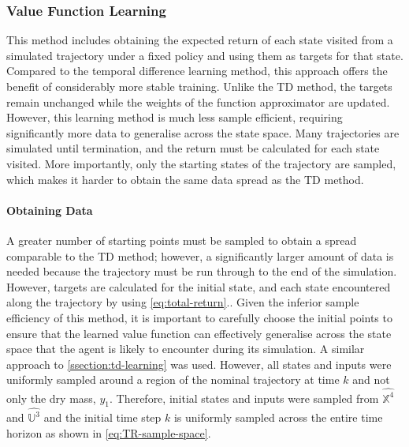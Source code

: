 \subsubsection{Value Function Learning}
This method includes obtaining the expected return of each state visited from a simulated trajectory under a fixed policy and using them as targets for that state. Compared to the temporal difference learning method, this approach offers the benefit of considerably more stable training. Unlike the TD method, the targets remain unchanged while the weights of the function approximator are updated. However, this learning method is much less sample efficient, requiring significantly more data to generalise across the state space. Many trajectories are simulated until termination, and the return must be calculated for each state visited. More importantly, only the starting states of the trajectory are sampled, which makes it harder to obtain the same data spread as the TD method.

\paragraph{Obtaining Data}
A greater number of starting points must be sampled to obtain a spread comparable to the TD method; however, a significantly larger amount of data is needed because the trajectory must be run through to the end of the simulation. However, targets are calculated for the initial state, and each state encountered along the trajectory by using \autoref{eq:total-return}.. Given the inferior sample efficiency of this method, it is important to carefully choose the initial points to ensure that the learned value function can effectively generalise across the state space that the agent is likely to encounter during its simulation. A similar approach to \autoref{ssection:td-learning} was used. However, all states and inputs were uniformly sampled around a region of the nominal trajectory at time $k$ and not only the dry mass, $y_1$. Therefore, initial states and inputs were sampled from $\hat{\mathbb{X}^4}$ and $\hat{\mathbb{U}^3}$ and the initial time step $k$ is uniformly sampled across the entire time horizon as shown in \autoref{eq:TR-sample-space}.

